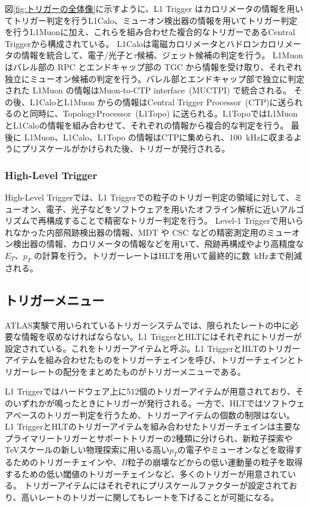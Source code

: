 図\ref{fig:トリガーの全体像}に示すように、L1 Trigger はカロリメータの情報を用いてトリガー判定を行うL1Calo、ミューオン検出器の情報を用いてトリガー判定を行うL1Muonに加え、これらを組み合わせた複合的なトリガーであるCentral Triggerから構成されている。
L1Caloは電磁カロリメータとハドロンカロリメータの情報を統合して、電子/光子と$\tau$候補、ジェット候補の判定を行う。
L1Muonはバレル部の RPC とエンドキャップ部の TGC から情報を受け取り、それぞれ独立にミューオン候補の判定を行う。バレル部とエンドキャップ部で独立に判定された L1Muon の情報はMuon-to-CTP interface~(MUCTPI) で統合される。
その後、L1CaloとL1Muon からの情報はCentral Trigger Processor~(CTP)に送られるのと同時に、TopologyProcessor~(L1Topo) に送られる。L1TopoではL1MuonとL1Caloの情報を組み合わせて、それぞれの情報から複合的な判定を行う。
最後に L1Muon、L1Calo、L1Topo の情報はCTPに集められ、100~kHzに収まるようにプリスケールがかけられた後、トリガーが発行される。

\subsubsection{High-Level Trigger}
High-Level Triggerでは、L1 Triggerでの粒子のトリガー判定の領域に対して、ミューオン、電子、光子などをソフトウェアを用いたオフライン解析に近いアルゴリズムで再構成することで精密なトリガー判定を行う。
Level-1 Triggerで用いられなかった内部飛跡検出器の情報、MDT や CSC などの精密測定用のミューオン検出器の情報、カロリメータの情報などを用いて、飛跡再構成やより高精度な $E_T$、$p_T$ の計算を行う。トリガーレートはHLTを用いて最終的に数~kHzまで削減される。

\subsection{トリガーメニュー}
ATLAS実験で用いられているトリガーシステムでは、限られたレートの中に必要な情報を収めなければならない。L1 TriggerとHLTにはそれぞれにトリガーが設定されている。これをトリガーアイテムと呼ぶ。L1 TriggerとHLTのトリガーアイテムを組み合わせたものをトリガーチェインを呼び、トリガーチェインとトリガーレートの配分をまとめたものがトリガーメニューである。

L1 Triggerではハードウェア上に512個のトリガーアイテムが用意されており、そのいずれかが鳴ったときにトリガーが発行される。一方で、HLTではソフトウェアベースのトリガー判定を行うため、トリガーアイテムの個数の制限はない。
L1 TriggerとHLTのトリガーアイテムを組み合わせたトリガーチェインは主要なプライマリートリガーとサポートトリガーの2種類に分けられ、新粒子探索やTeVスケールの新しい物理探索に用いる高い$p_T$の電子やミューオンなどを取得するためのトリガーチェインや、$B$粒子の崩壊などからの低い運動量の粒子を取得するための低い閾値のトリガーチェインなど、多くのトリガーが用意されている。
トリガーアイテムにはそれぞれにプリスケールファクターが設定されており、高いレートのトリガーに関してもレートを下げることが可能になる。

